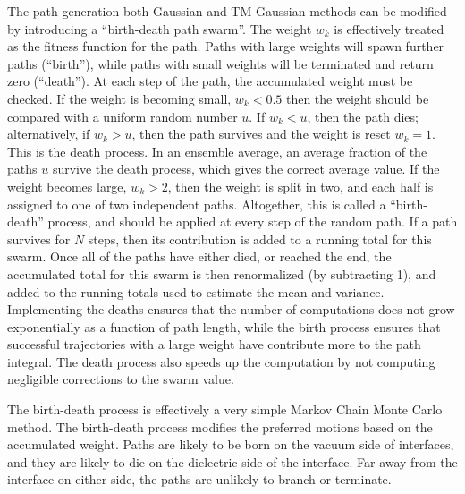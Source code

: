 
The path generation both Gaussian and TM-Gaussian methods can be modified by introducing a ``birth-death path swarm''.  
The weight $w_k$ is effectively treated as 
the fitness function for the path.  Paths with large weights will spawn further paths (``birth''), while paths with
small weights will be terminated and return zero (``death'').  At each step of the path, the 
accumulated weight must be checked.
If the weight is becoming small, $w_k<0.5$ then the weight should be compared with a uniform random number $u$.
If $w_k<u$, then the path dies; alternatively, if $w_k>u$, then 
the path survives and the weight is reset $w_k=1$.  This is the death process.
In an ensemble average, an average fraction of the paths $u$ survive the death process, which gives 
the correct average value.
If the weight becomes large, $w_k>2$, then the weight is split in two, and each half is assigned to 
one of two independent paths.
Altogether, this is called a ``birth-death'' process, and should be applied at every step of the random path.
If a path survives for $N$ steps, then its contribution is added to a running total for this swarm.
Once all of the paths have either died, or reached the end, the accumulated total for this swarm is then
renormalized (by subtracting 1), and added to the running totals used to estimate the mean and variance.  
Implementing the deaths ensures that the number of computations  does not grow exponentially as a function 
of path length, while the birth process ensures that successful trajectories with a large weight have 
contribute more to the path integral.  The death process also speeds up the computation by not computing 
negligible corrections to the swarm value.  

The birth-death process is effectively a very simple Markov Chain Monte Carlo method.  The birth-death
process modifies the preferred motions based on the accumulated weight.  Paths are likely to be born
on the vacuum side of interfaces, and they are likely to die on the dielectric side of the interface.
Far away from the interface on either side, the paths are unlikely to branch or terminate.  

